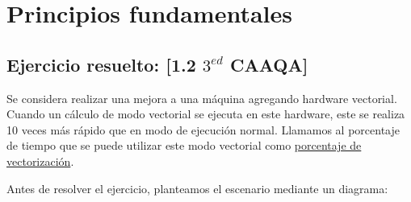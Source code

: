 \newcommand{\SU}{\textit{Speed Up }}
\newcommand{\BMRK}{\textit{benchmark }}

\newcommand*{\threeemdash}{\rule[0.5ex]{3em}{0.55pt}}
\section{Principios fundamentales}

\subsection{Ejercicio resuelto: [1.2 $3^{ed}$ CAAQA]}
Se considera realizar una mejora a una máquina agregando hardware vectorial. Cuando un cálculo de modo vectorial se ejecuta en este hardware, este se realiza 10 veces más rápido que en modo de ejecución normal. Llamamos al porcentaje de tiempo que se puede utilizar este modo vectorial como \underline{porcentaje de vectorización}.


Antes de resolver el ejercicio, planteamos el escenario mediante un diagrama:


